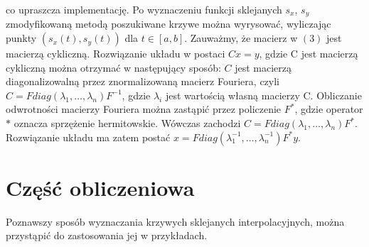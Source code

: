 \documentclass[11pt,wide]{article}
\begin{document}
co upraszcza implementację. Po wyznaczeniu funkcji sklejanych $s_x$, $s_y$ zmodyfikowaną metodą poszukiwane krzywe można wyrysować, wyliczając
punkty $(s_x(t), s_y(t))$ dla $t \in [a, b]$.
Zauważmy, że macierz w $(3)$ jest macierzą cykliczną. Rozwiązanie układu w postaci $Cx=y$, gdzie C jest macierzą cykliczną można otrzymać w następujący sposób: $C$ jest macierzą diagonalizowalną przez znormalizowaną macierz Fouriera, czyli $C=Fdiag(\lambda_1, \dots, \lambda_n)F^{-1}$, gdzie $\lambda_i$ jest wartością własną macierzy C. Obliczanie odwrotności macierzy Fouriera można zastąpić przez policzenie $F^*$, gdzie operator $*$ oznacza sprzężenie hermitowskie. Wówczas zachodzi $C=Fdiag(\lambda_1, \dots, \lambda_n)F^*$. Rozwiązanie układu ma zatem postać $x = Fdiag(\lambda_1^{-1}, \dots, \lambda_n^{-1})F^*y$.
\\

\section{Część obliczeniowa}
Poznawszy sposób wyznaczania krzywych sklejanych interpolacyjnych, można przystąpić do zastosowania jej w przykładach.
\end{document}
